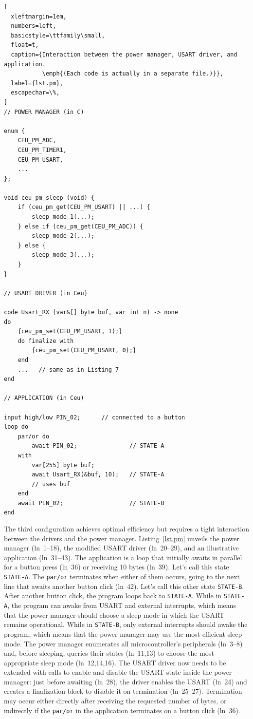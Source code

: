 \documentclass[sigplan,10pt,review,anonymous]{acmart}\settopmatter{printfolios=true,printccs=false,printacmref=false}
\newcommand{\code}[1] {{\small{\texttt{#1}}}}
\begin{document}
\begin{lstlisting}[
  xleftmargin=1em,
  numbers=left,
  basicstyle=\ttfamily\small,
  float=t,
  caption={Interaction between the power manager, USART driver, and application.
           \emph{(Each code is actually in a separate file.)}},
  label={lst.pm},
  escapechar=\%,
]
// POWER MANAGER (in C)

enum {
    CEU_PM_ADC,
    CEU_PM_TIMER1,
    CEU_PM_USART,
    ...
};

void ceu_pm_sleep (void) {
    if (ceu_pm_get(CEU_PM_USART) || ...) {
        sleep_mode_1(...);
    } else if (ceu_pm_get(CEU_PM_ADC)) {
        sleep_mode_2(...);
    } else {
        sleep_mode_3(...);
    }
}

// USART DRIVER (in Ceu)

code Usart_RX (var&[] byte buf, var int n) -> none
do
    {ceu_pm_set(CEU_PM_USART, 1);}
    do finalize with
        {ceu_pm_set(CEU_PM_USART, 0);}
    end
    ...   // same as in Listing 7
end

// APPLICATION (in Ceu)

input high/low PIN_02;      // connected to a button
loop do
    par/or do
        await PIN_02;               // STATE-A
    with
        var[255] byte buf;
        await Usart_RX(&buf, 10);   // STATE-A
        // uses buf
    end
    await PIN_02;                   // STATE-B
end
\end{lstlisting}

The third configuration achieves optimal efficiency but requires a tight
interaction between the drivers and the power manager.
%
Listing~\ref{lst.pm} unveils the power manager (ln~1--18), the modified USART
driver (ln~20--29), and an illustrative application (ln~31--43).
%
The application is a loop that initially awaits in parallel for a button press (ln~36) or
receiving 10 bytes (ln~39).
Let's call this state \code{STATE-A}.
The \code{par/or} terminates when either of them occurs, going to the next line
that awaits another button click (ln~42).
Let's call this other state \code{STATE-B}.
After another button click, the program loops back to \code{STATE-A}.
%
While in \code{STATE-A}, the program can awake from USART and external
interrupts, which means that the power manager should choose a sleep mode in
which the USART remains operational.
%
While in \code{STATE-B}, only external interrupts should awake the program,
which means that the power manager may use the most efficient sleep mode.
%
The power manager enumerates all microcontroller's peripherals (ln~3--8) and,
before sleeping, queries their states (ln~11,13) to choose the most appropriate
sleep mode (ln~12,14,16).
%
The USART driver now needs to be extended with calls to enable and disable the
USART state inside the power manager: just before awaiting (ln~28), the driver enables
the USART (ln~24) and creates a finalization block to disable it on
termination (ln~25--27).
Termination may occur either directly after receiving the requested number of
bytes, or indirectly if the \code{par/or} in the application terminates on a
button click (ln~36).
\end{document}
